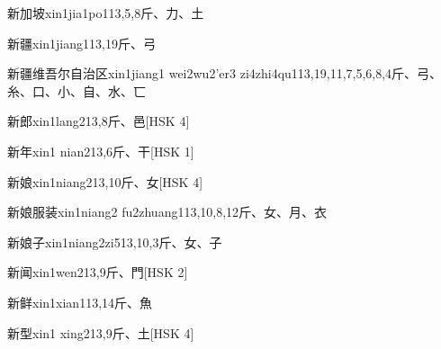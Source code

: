 \begin{entry}{新加坡}{xin1jia1po1}{13,5,8}{⽄、⼒、⼟}
\end{entry}

\begin{entry}{新疆}{xin1jiang1}{13,19}{⽄、⼸}
\end{entry}

\begin{entry}{新疆维吾尔自治区}{xin1jiang1 wei2wu2'er3 zi4zhi4qu1}{13,19,11,7,5,6,8,4}{⽄、⼸、⽷、⼝、⼩、⾃、⽔、⼖}
\end{entry}

\begin{entry}{新郎}{xin1lang2}{13,8}{⽄、⾢}[HSK 4]
\end{entry}

\begin{entry}{新年}{xin1 nian2}{13,6}{⽄、⼲}[HSK 1]
\end{entry}

\begin{entry}{新娘}{xin1niang2}{13,10}{⽄、⼥}[HSK 4]
\end{entry}

\begin{entry}{新娘服装}{xin1niang2 fu2zhuang1}{13,10,8,12}{⽄、⼥、⽉、⾐}
\end{entry}

\begin{entry}{新娘子}{xin1niang2zi5}{13,10,3}{⽄、⼥、⼦}
\end{entry}

\begin{entry}{新闻}{xin1wen2}{13,9}{⽄、⾨}[HSK 2]
\end{entry}

\begin{entry}{新鲜}{xin1xian1}{13,14}{⽄、⿂}
\end{entry}

\begin{entry}{新型}{xin1 xing2}{13,9}{⽄、⼟}[HSK 4]
\end{entry}

